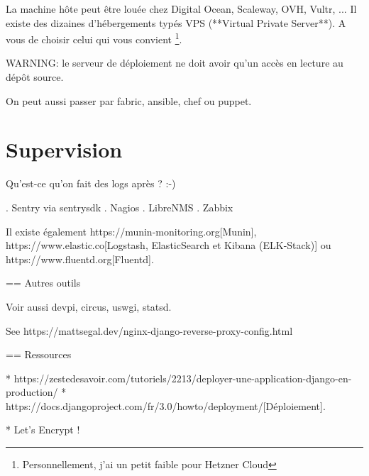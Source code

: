 La machine hôte peut être louée chez Digital Ocean, Scaleway, OVH, Vultr, ... Il existe des dizaines d'hébergements typés VPS (**Virtual Private Server**). 
A vous de choisir celui qui vous convient \footnote{Personnellement, j'ai un petit faible pour Hetzner Cloud}.





WARNING: le serveur de déploiement ne doit avoir qu'un accès en lecture au dépôt source.

On peut aussi passer par fabric, ansible, chef ou puppet.

\section{Supervision}

Qu'est-ce qu'on fait des logs après ? :-)

. Sentry via sentrysdk
. Nagios
. LibreNMS
. Zabbix

Il existe également https://munin-monitoring.org[Munin], https://www.elastic.co[Logstash, ElasticSearch et Kibana (ELK-Stack)] ou https://www.fluentd.org[Fluentd].

== Autres outils

Voir aussi devpi, circus, uswgi, statsd.

See https://mattsegal.dev/nginx-django-reverse-proxy-config.html

== Ressources

* https://zestedesavoir.com/tutoriels/2213/deployer-une-application-django-en-production/
* https://docs.djangoproject.com/fr/3.0/howto/deployment/[Déploiement].

* Let's Encrypt !

